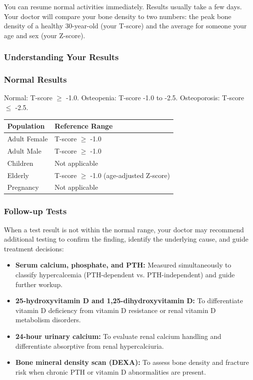 You can resume normal activities immediately. Results usually take a few days. Your doctor will compare your bone density to two numbers: the peak bone density of a healthy 30-year-old (your T-score) and the average for someone your age and sex (your Z-score).

\subsubsection*{Understanding Your Results}

\subsubsection*{Normal Results}
Normal: T-score $\ge$ -1.0. Osteopenia: T-score -1.0 to -2.5. Osteoporosis: T-score $\le$ -2.5.

\begin{center}
\begin{tabular}{ll}
\toprule
\textbf{Population} & \textbf{Reference Range} \\
\midrule
Adult Female & T-score $\ge$ -1.0 \\
Adult Male & T-score $\ge$ -1.0 \\
Children & Not applicable \\
Elderly & T-score $\ge$ -1.0 (age-adjusted Z-score) \\
Pregnancy & Not applicable \\
\bottomrule
\end{tabular}
\end{center}
\subsubsection*{Follow-up Tests}
When a test result is not within the normal range, your doctor may recommend additional testing to confirm the finding, identify the underlying cause, and guide treatment decisions:
\begin{itemize}
    \item \textbf{Serum calcium, phosphate, and PTH:} Measured simultaneously to classify hypercalcemia (PTH-dependent vs. PTH-independent) and guide further workup.
    \item \textbf{25-hydroxyvitamin D and 1,25-dihydroxyvitamin D:} To differentiate vitamin D deficiency from vitamin D resistance or renal vitamin D metabolism disorders.
    \item \textbf{24-hour urinary calcium:} To evaluate renal calcium handling and differentiate absorptive from renal hypercalciuria.
    \item \textbf{Bone mineral density scan (DEXA):} To assess bone density and fracture risk when chronic PTH or vitamin D abnormalities are present.
\end{itemize}
\clearpage
